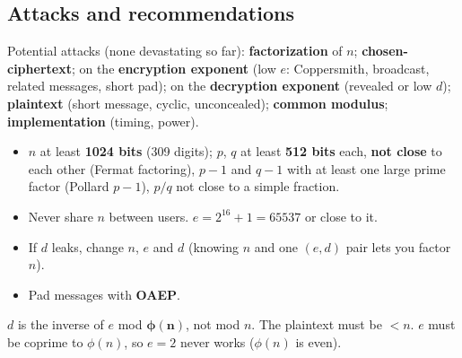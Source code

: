 \subsection{Attacks and recommendations}
Potential attacks (none devastating so far): \textbf{factorization} of $n$; \textbf{chosen-ciphertext}; on the \textbf{encryption exponent} (low $e$: Coppersmith, broadcast, related messages, short pad); on the \textbf{decryption exponent} (revealed or low $d$); \textbf{plaintext} (short message, cyclic, unconcealed); \textbf{common modulus}; \textbf{implementation} (timing, power).
\begin{itemize}
  \item $n$ at least \textbf{1024 bits} (309 digits); $p$, $q$ at least \textbf{512 bits} each, \textbf{not close} to each other (Fermat factoring), $p - 1$ and $q - 1$ with at least one large prime factor (Pollard $p - 1$), $p/q$ not close to a simple fraction.
  \item Never share $n$ between users. $e = 2^{16} + 1 = 65537$ or close to it.
  \item If $d$ leaks, change $n$, $e$ and $d$ (knowing $n$ and one $(e, d)$ pair lets you factor $n$).
  \item Pad messages with \textbf{OAEP}.
\end{itemize}

\begin{trap}
$d$ is the inverse of $e$ mod $\boldsymbol{\phi(n)}$, not mod $n$. The plaintext must be $< n$. $e$ must be coprime to $\phi(n)$, so $e = 2$ never works ($\phi(n)$ is even).
\end{trap}
